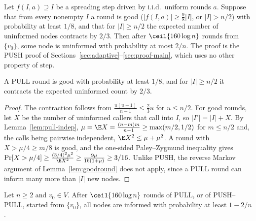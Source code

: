 \begin{lemma}
  \label{lem:pull-phases}
  \leanok
  Let $f(I,a) \supseteq I$ be a spreading step driven by i.i.d.\ uniform
  rounds $a$. Suppose that from every nonempty $I$ a round is good
  ($|f(I,a)| \ge \frac98 |I|$, or $|I| > n/2$) with probability at least
  $1/8$, and that for $|I| \ge n/2$ the expected number of uninformed nodes
  contracts by $2/3$. Then after $\ceil{160 \log n}$ rounds from $\{v_0\}$,
  some node is uninformed with probability at most $2/n$. The proof is the
  PUSH proof of Sections~\ref{sec:adaptive}--\ref{sec:proof-main}, which uses
  no other property of $\mathrm{step}$.
\end{lemma}

\begin{lemma}\label{lem:pull-good}
  \leanok
  A PULL round is good with probability at least $1/8$, and for
  $|I| \ge n/2$ it contracts the expected uninformed count by $2/3$.
\end{lemma}

\begin{proof}
  The contraction follows from $\frac{u(u-1)}{n-1} \le \frac23 u$ for
  $u \le n/2$. For good rounds, let $X$ be the number of uninformed callers
  that call into $I$, so $|I'| = |I| + X$. By Lemma~\ref{lem:pull-indep},
  $\mu = \E X = \frac{(n-m)m}{n-1} \ge \max(m/2, 1/2)$ for $m \le n/2$ and,
  the calls being pairwise independent, $\E X^2 \le \mu + \mu^2$. A round
  with $X > \mu/4 \ge m/8$ is good, and the one-sided Paley--Zygmund
  inequality gives
  $\Pr[X > \mu/4] \ge \frac{(3/4)^2\mu^2}{\E X^2} \ge \frac{9\mu}{16(1+\mu)} \ge 3/16$.
  Unlike PUSH, the reverse Markov argument of Lemma~\ref{lem:goodround} does
  not apply, since a PULL round can inform many more than $|I|$ new nodes.
\end{proof}

\begin{theorem}
  \label{thm:pull}
  \leanok
  Let $n \ge 2$ and $v_0 \in V$. After $\ceil{160 \log n}$ rounds of PULL,
  or of PUSH--PULL, started from $\{v_0\}$, all nodes are informed with
  probability at least $1 - 2/n$.
\end{theorem}

